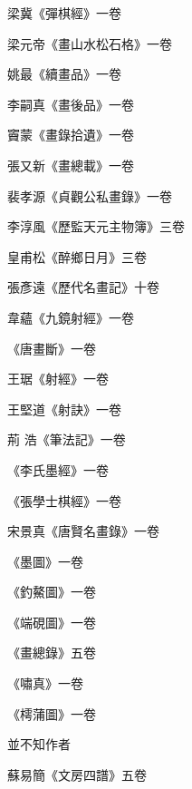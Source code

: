 \begin{pinyinscope}
 梁冀《彈棋經》一卷



 梁元帝《畫山水松石格》一卷



 姚最《續畫品》一卷



 李嗣真《畫後品》一卷



 竇蒙《畫錄拾遺》一卷



 張又新《畫總載》一卷



 裴孝源《貞觀公私畫錄》一卷



 李淳風《歷監天元主物簿》三卷



 皇甫松《醉鄉日月》三卷



 張彥遠《歷代名畫記》十卷



 韋蘊《九鏡射經》一卷



 《唐畫斷》一卷



 王琚《射經》一卷



 王堅道《射訣》一卷



 荊
 浩《筆法記》一卷



 《李氏墨經》一卷



 《張學士棋經》一卷



 宋景真《唐賢名畫錄》一卷



 《墨圖》一卷



 《釣鰲圖》一卷



 《端硯圖》一卷



 《畫總錄》五卷



 《嘯真》一卷



 《樗蒲圖》一卷



 並不知作者



 蘇易簡《文房四譜》五卷




\end{pinyinscope}
